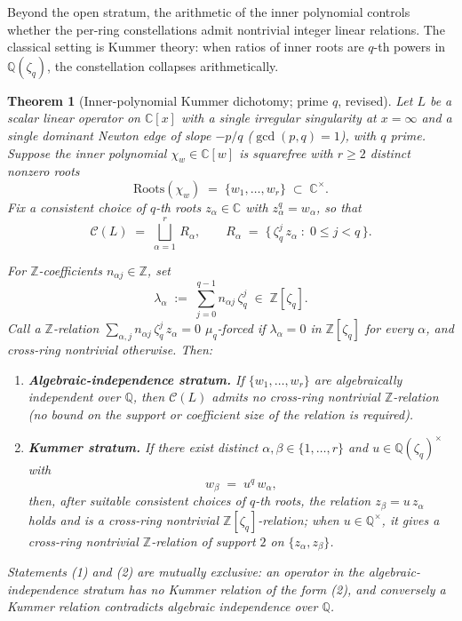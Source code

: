 \documentclass[aip,jmp,preprint,amsmath,amssymb,nofootinbib,floatfix]{revtex4-2}
\theoremstyle{plain}
\newtheorem{theorem}{Theorem}[section]
\theoremstyle{definition}
\theoremstyle{remark}
\newcommand{\Roots}{\mathrm{Roots}}
\newcommand{\Cl}{\mathcal{C}}
\newcommand{\Zlc}{\mathbb{Z}[\zeta_q]}
\newcommand{\Qlc}{\mathbb{Q}(\zeta_q)}
\begin{document}
Beyond the open stratum, the arithmetic of the inner polynomial controls
whether the per-ring constellations admit nontrivial integer linear
relations. The classical setting is Kummer theory: when ratios of inner
roots are $q$-th powers in $\mathbb{Q}(\zeta_q)$, the constellation
collapses arithmetically.

\begin{theorem}[Inner-polynomial Kummer dichotomy; prime $q$,
revised]\label{thm:D2}
Let $L$ be a scalar linear operator on $\mathbb{C}[x]$ with a single
irregular singularity at $x = \infty$ and a single dominant Newton edge
of slope $-p/q$ ($\gcd(p, q) = 1$), with $q$ prime. Suppose the inner
polynomial $\chi_w \in \mathbb{C}[w]$ is squarefree with
$r \ge 2$ distinct nonzero roots
\[
   \Roots(\chi_w) \;=\; \{w_1, \dots, w_r\} \;\subset\;
   \mathbb{C}^\times.
\]
Fix a consistent choice of $q$-th roots $z_\alpha \in \mathbb{C}$
with $z_\alpha^q = w_\alpha$, so that
\[
   \Cl(L) \;=\; \bigsqcup_{\alpha = 1}^{r}\, R_\alpha,
   \qquad
   R_\alpha \;=\; \big\{\,\zeta_q^j\, z_\alpha\;:\; 0 \le j < q\,\big\}.
\]

For $\mathbb{Z}$-coefficients $n_{\alpha j} \in \mathbb{Z}$, set
\[
   \lambda_\alpha \;:=\; \sum_{j = 0}^{q-1} n_{\alpha j}\, \zeta_q^j
   \;\in\; \Zlc.
\]
Call a $\mathbb{Z}$-relation $\sum_{\alpha, j} n_{\alpha j}\, \zeta_q^j\,
z_\alpha = 0$ \emph{$\mu_q$-forced} if $\lambda_\alpha = 0$ in $\Zlc$
for every $\alpha$, and \emph{cross-ring nontrivial} otherwise. Then:
\begin{enumerate}[leftmargin=2em]
\item \textbf{Algebraic-independence stratum.} If $\{w_1, \dots, w_r\}$
are algebraically independent over $\mathbb{Q}$, then $\Cl(L)$ admits
\emph{no} cross-ring nontrivial $\mathbb{Z}$-relation (no bound on
the support or coefficient size of the relation is required).
\item \textbf{Kummer stratum.} If there exist distinct
$\alpha, \beta \in \{1, \dots, r\}$ and $u \in \Qlc^\times$ with
\[
   w_\beta \;=\; u^q\, w_\alpha,
\]
then, after suitable consistent choices of $q$-th roots, the relation
$z_\beta = u\, z_\alpha$ holds and is a cross-ring nontrivial
$\Zlc$-relation; when $u \in \mathbb{Q}^\times$, it gives a
cross-ring nontrivial $\mathbb{Z}$-relation of support $2$ on
$\{z_\alpha, z_\beta\}$.
\end{enumerate}
Statements (1) and (2) are mutually exclusive: an operator in the
algebraic-independence stratum has no Kummer relation of the form (2),
and conversely a Kummer relation contradicts algebraic independence
over $\mathbb{Q}$.
\end{theorem}
\end{document}
